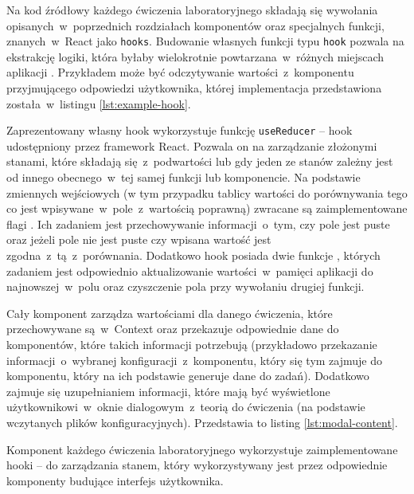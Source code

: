 Na kod źródłowy każdego ćwiczenia laboratoryjnego składają się wywołania opisanych~w~poprzednich
rozdziałach komponentów oraz specjalnych funkcji, znanych~w~React jako \texttt{hooks}. Budowanie
własnych funkcji typu \texttt{hook} pozwala na ekstrakcję logiki, która byłaby wielokrotnie
powtarzana~w~różnych miejscach aplikacji \cite{react-docs}. Przykładem może być odczytywanie
wartości~z~komponentu przyjmującego odpowiedzi użytkownika, której implementacja przedstawiona
została~w~listingu
\ref{lst:example-hook}.


Zaprezentowany własny hook wykorzystuje funkcję \texttt{useReducer} -- hook udostępniony przez
framework React. Pozwala on na zarządzanie złożonymi stanami, które składają się~z~podwartości lub
gdy jeden ze stanów zależny jest od innego obecnego~w~tej samej funkcji lub komponencie. Na
podstawie zmiennych wejściowych (w tym przypadku tablicy wartości do porównywania tego co jest
wpisywane~w~pole~z~wartością poprawną) zwracane są zaimplementowane flagi . Ich zadaniem jest przechowywanie informacji~o~tym, czy pole jest puste oraz jeżeli
pole nie jest puste czy wpisana wartość jest zgodna~z~tą~z~porównania. Dodatkowo hook posiada dwie
funkcje , których zadaniem jest odpowiednio aktualizowanie
wartości~w~pamięci aplikacji do najnowszej~w~polu oraz czyszczenie pola przy wywołaniu drugiej
funkcji.

Cały komponent zarządza wartościami dla danego ćwiczenia, które przechowywane są~w~Context oraz
przekazuje odpowiednie dane do komponentów, które takich informacji potrzebują
(przykładowo przekazanie informacji~o~wybranej konfiguracji~z~komponentu, który się tym zajmuje do
komponentu, który na ich podstawie generuje dane do zadań). Dodatkowo zajmuje się uzupełnianiem
informacji, które mają być wyświetlone użytkownikowi~w~oknie dialogowym~z~teorią do ćwiczenia
(na podstawie wczytanych plików konfiguracyjnych). Przedstawia to listing \ref{lst:modal-content}.


Komponent każdego ćwiczenia laboratoryjnego wykorzystuje zaimplementowane hooki --
 do zarządzania
stanem, który wykorzystywany jest przez odpowiednie komponenty budujące interfejs użytkownika.

